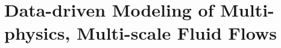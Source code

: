 \chapter{Data-driven Modeling of Multi-physics, Multi-scale Fluid Flows}
\label{chap:Overview}







